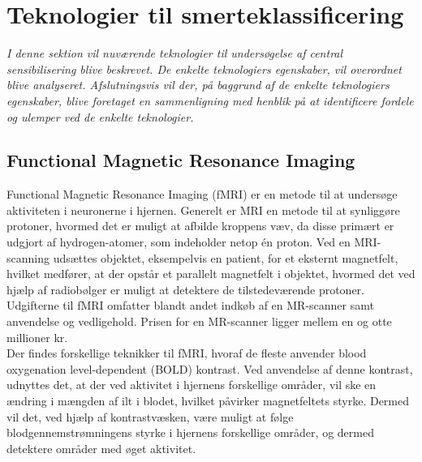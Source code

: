 \section{Teknologier til smerteklassificering} %
\textit{I denne sektion vil nuværende teknologier til undersøgelse af central sensibilisering blive beskrevet. De enkelte teknologiers egenskaber, vil overordnet blive analyseret. Afslutningsvis vil der, på baggrund af de enkelte teknologiers egenskaber, blive foretaget en sammenligning med henblik på at identificere fordele og ulemper ved de enkelte teknologier.}

\subsection{Functional Magnetic Resonance Imaging}
Functional Magnetic Resonance Imaging (fMRI) er en metode til at undersøge aktiviteten i neuronerne i hjernen.
Generelt er MRI en metode til at synliggøre protoner, hvormed det er muligt at afbilde kroppens væv, da disse primært er udgjort af hydrogen-atomer, som indeholder netop én proton. 
Ved en MRI-scanning udsættes objektet, eksempelvis en patient, for et eksternt magnetfelt, hvilket medfører, at der opstår et parallelt magnetfelt i objektet, hvormed det ved hjælp af radiobølger er muligt at detektere de tilstedeværende protoner. \citep{Wals2009} Udgifterne til fMRI omfatter blandt andet indkøb af en MR-scanner samt anvendelse og vedligehold. Prisen for en MR-scanner ligger mellem en og otte millioner kr. \citep{Glover2014}\\ 
Der findes forskellige teknikker til fMRI, hvoraf de fleste anvender blood oxygenation level-dependent (BOLD) kontrast. Ved anvendelse af denne kontrast, udnyttes det, at der ved aktivitet i hjernens forskellige områder, vil ske en ændring i mængden af ilt i blodet, hvilket påvirker magnetfeltets styrke. Dermed vil det, ved hjælp af kontrastvæsken, være muligt at følge blodgennemstrømningens styrke i hjernens forskellige områder, og dermed detektere områder med øget aktivitet. \citep{Wals2009} 

